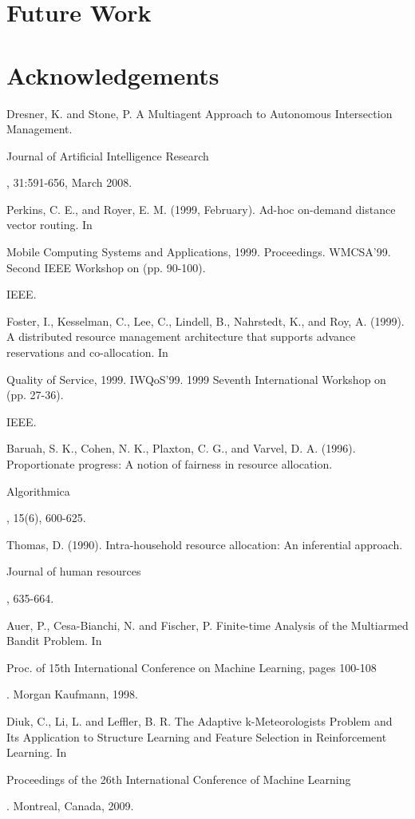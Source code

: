 \documentclass[conference]{IEEEtran}
\begin{document}
\section{Future Work}


\section{Acknowledgements}

\begin{thebibliography}{1}
Dresner, K. and Stone, P. A Multiagent Approach to Autonomous Intersection Management. \begin{em}Journal of Artificial Intelligence Research\end{em}, 31:591-656, March 2008.

Perkins, C. E., and Royer, E. M. (1999, February). Ad-hoc on-demand distance vector routing. In \begin{em}Mobile Computing Systems and Applications, 1999. Proceedings. WMCSA'99. Second IEEE Workshop on (pp. 90-100).\end{em} IEEE.

Foster, I., Kesselman, C., Lee, C., Lindell, B., Nahrstedt, K., and Roy, A. (1999). A distributed resource management architecture that supports advance reservations and co-allocation. In \begin{em}Quality of Service, 1999. IWQoS'99. 1999 Seventh International Workshop on (pp. 27-36).\end{em} IEEE.

Baruah, S. K., Cohen, N. K., Plaxton, C. G., and Varvel, D. A. (1996). Proportionate progress: A notion of fairness in resource allocation. \begin{em}Algorithmica\end{em}, 15(6), 600-625.

Thomas, D. (1990). Intra-household resource allocation: An inferential approach. \begin{em}Journal of human resources\end{em}, 635-664.

Auer, P., Cesa-Bianchi, N. and Fischer, P. Finite-time Analysis of the Multiarmed Bandit Problem. In \begin{em} Proc. of 15th International Conference on Machine Learning, pages 100-108\end{em}. Morgan Kaufmann, 1998.

Diuk, C., Li, L. and Leffler, B. R. The Adaptive k-Meteorologists Problem and Its Application to Structure Learning and Feature Selection in Reinforcement Learning. In \begin{em} Proceedings of the 26th International Conference of Machine Learning\end{em}. Montreal, Canada, 2009. 

\end{thebibliography}




\end{document}

